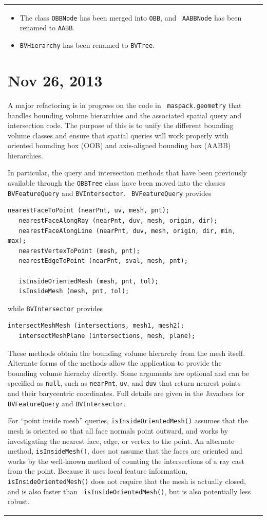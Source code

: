 \documentclass{article}
\begin{document}
\begin{tabular}{ll}
\begin{itemize}
\item The class {\tt OBBNode} has been merged into {\tt OBB}, and {\tt
AABBNode} has been renamed to {\tt AABB}.

\item {\tt BVHierarchy} has been renamed to {\tt BVTree}.

\end{itemize}

\section*{Nov 26, 2013}

A major refactoring is in progress on the code in {\tt
maspack.geometry} that handles bounding volume hierarchies and the
associated spatial query and intersection code. The purpose of this is
to unify the different bounding volume classes and ensure that spatial
queries will work properly with oriented bounding box (OOB) and
axis-aligned bounding box (AABB) hierarchies. 

In particular, the query and intersection methods that have been
previously available through the {\tt OBBTree} class have been moved
into the classes {\tt BVFeatureQuery} and {\tt BVIntersector}. {\tt
BVFeatureQuery} provides
\begin{lstlisting}[]
   nearestFaceToPoint (nearPnt, uv, mesh, pnt);
   nearestFaceAlongRay (nearPnt, duv, mesh, origin, dir);
   nearestFaceAlongLine (nearPnt, duv, mesh, origin, dir, min, max);
   nearestVertexToPoint (mesh, pnt);
   nearestEdgeToPoint (nearPnt, sval, mesh, pnt);

   isInsideOrientedMesh (mesh, pnt, tol);
   isInsideMesh (mesh, pnt, tol);
\end{lstlisting}
while {\tt BVIntersector} provides
\begin{lstlisting}[]
   intersectMeshMesh (intersections, mesh1, mesh2);
   intersectMeshPlane (intersections, mesh, plane);
\end{lstlisting}

These methods obtain the bounding volume hierarchy from the mesh
itself. Alternate forms of the methods allow the application to
provide the bounding volume hierachy directly. Some arguments are
optional and can be specified as {\tt null}, such as {\tt nearPnt},
{\tt uv}, and {\tt duv} that return nearest points and their
barycentric coordinates. Full details are given in the Javadocs for
{\tt BVFeatureQuery} and {\tt BVIntersector}.

For ``point inside mesh'' queries, {\tt isInsideOrientedMesh()} assumes
that the mesh is oriented so that all face normals point outward, and
works by investigating the nearest face, edge, or vertex to the point.
An alternate method, {\tt isInsideMesh()}, does not assume that the
faces are oriented and works by the well-known method of counting the
intersections of a ray cast from the point. Because it uses local
feature information, {\tt isInsideOrientedMesh()} does not require
that the mesh is actually closed, and is also faster than {\tt
isInsideOrientedMesh()}, but is also potentially less robust.


\end{tabular}
\end{document}

